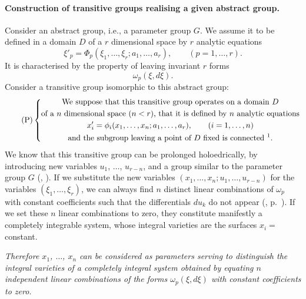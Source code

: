 \paragraph{Construction of transitive groups realising a given abstract group.}
\label{sec:116}
Consider an abstract group, i.e., a parameter group $G$. We assume it to be defined in a domain $D$ of a $r$ dimensional space by $r$ analytic equations
\begin{equation}
  \label{eq:9.1}
  \xi'_{p}=\Phi_{p}(\xi_{1},\dots,\xi_{r};a_{1},\dots,a_{r}),\qquad(p=1,\dots,r).
\end{equation}
It is characterised by the property of leaving invariant $r$ forms
\[
\omega_{p}(\xi,d\xi).
\]
Consider a transitive group isomorphic to this abstract group:
\begin{equation}
  \label{eq:9.p}\tag{P}
  \left\{
    \begin{gathered}
      \text{We suppose that this transitive group operates on a domain $D$}\\
      \text{of a $n$ dimensional space $(n<r)$, that it is defined by $n$ analytic equations}\\
      x'_{i}=\phi_{i}(x_{1},\dots,x_{n};a_{1},\dots,a_{r}),\qquad(i=1,\dots,n)\\
      \text{and the subgroup leaving a point of $D$ fixed is connected \footnotemark.}
    \end{gathered}
  \right.
\end{equation}
We know that this transitive group can be prolonged holoedrically, by introducing new variables $u_{1}$, $\dots$, $u_{r-n}$, and a group similar to the parameter group $G$ (, \pageref{sec:100}). If we substitute the new variables $(x_{1},\dots,x_{n};u_{1},\dots,u_{r-n})$ for the variables $(\xi_{1},\dots,\xi_{r})$, we can always find $n$ distinct linear combinations of $\omega_{p}$ with constant coefficients such that the differentials $du_{k}$ do not appear (, p.~\pageref{sec:109}). If we set these $n$ linear combinations to zero, they constitute manifestly a completely integrable system, whose integral varieties are the surfaces $x_{i}=$ constant.

\somespace

\emph{Therefore $x_{1}$, $\dots$, $x_{n}$ can be considered as parameters serving to distinguish the integral varieties of a completely integral system obtained by equating $n$ independent linear combinations of the forms $\omega_{p}(\xi,d\xi)$ with constant coefficients to zero.}

